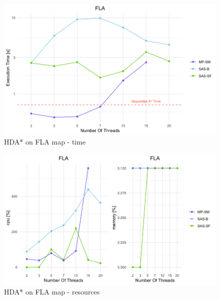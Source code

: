 \documentclass[twocolumn, switch]{article} %
\begin{document}
\begin{figure}[ht!]
  \centering
  \includegraphics[width=1\linewidth]{hda/flatime.png}
  \caption{HDA* on FLA map - time}
  \label{cmpflatime}
\end{figure}
\begin{figure}[ht!]
  \centering
  \includegraphics[width=1\linewidth]{hda/flacpumem.png}
  \caption{HDA* on FLA map - resources}
  \label{cmpflacpumem}
\end{figure}
\end{document}
